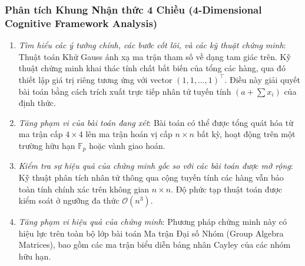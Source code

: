 \documentclass{article}
\begin{document}
\subsubsection*{Phân tích Khung Nhận thức 4 Chiều (4-Dimensional Cognitive Framework Analysis)}
\begin{enumerate}
 \item \textit{Tìm hiểu các ý tưởng chính, các bước cốt lõi, và các kỹ thuật chứng minh}: Thuật toán Khử Gauss ánh xạ ma trận tham số về dạng tam giác trên. Kỹ thuật chứng minh khai thác tính chất bất biến của tổng các hàng, qua đó thiết lập giá trị riêng tương ứng với vector $(1, 1, \dots, 1)^\top$. Điều này giải quyết bài toán bằng cách trích xuất trực tiếp nhân tử tuyến tính $(a + \sum x_i)$ của định thức.
 \item \textit{Tăng phạm vi của bài toán đang xét}: Bài toán có thể được tổng quát hóa từ ma trận cấp $4 \times 4$ lên ma trận hoán vị cấp $n \times n$ bất kỳ, hoạt động trên một trường hữu hạn $\mathbb{F}_p$ hoặc vành giao hoán.
 \item \textit{Kiểm tra sự hiệu quả của chứng minh gốc so với các bài toán được mở rộng}: Kỹ thuật phân tích nhân tử thông qua cộng tuyến tính các hàng vẫn bảo toàn tính chính xác trên không gian $n \times n$. Độ phức tạp thuật toán được kiểm soát ở ngưỡng đa thức $\mathcal{O}(n^3)$.
 \item \textit{Tăng phạm vi hiệu quả của chứng minh}: Phương pháp chứng minh này có hiệu lực trên toàn bộ lớp bài toán Ma trận Đại số Nhóm (Group Algebra Matrices), bao gồm các ma trận biểu diễn bảng nhân Cayley của các nhóm hữu hạn.
\end{enumerate}

\end{document}
